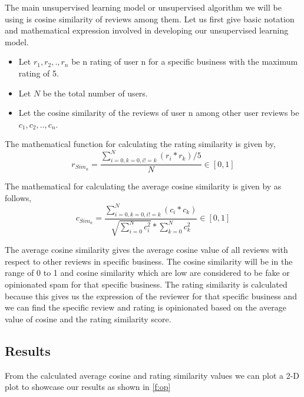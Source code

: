 \documentclass[sigconf]{acmart}
\begin{document}
The main unsupervised learning model or unsupervised algorithm we will be using is cosine similarity of reviews among them. Let us first give basic notation and mathematical expression involved in developing our unsupervised learning model.

\begin{itemize}
    \item Let \(r_1,r_2,.,r_n\) be n rating of user n for a specific business with the maximum rating of 5.
    \item Let \(N\) be the total number of users.
    \item Let the cosine similarity of the reviews of user n among other user reviews be \(c_1,c_2,..,c_n\).
\end{itemize}

The mathematical function for calculating the rating similarity is given by,
\begin{equation}
    r_{Sim_{n}} = \frac{\sum_{i=0,k=0,i!=k}^{N}(r_i*r_k)/5}{N} \in [0,1]
\end{equation}

The mathematical for calculating the average cosine similarity is given by as follows,
\begin{equation}
    c_{Sim_n} = \frac{\sum_{i=0,k=0,i!=k}^{N}(c_i*c_k)}{\sqrt{\sum_{i=0}^{N}c_i^2}* \sum_{k=0}^{N}c_k^2} \in [0,1]
\end{equation}

The average cosine similarity gives the average cosine value of all reviews with respect to other reviews in specific business. The cosine similarity will be in the range of 0 to 1 and cosine similarity which are low are considered to be fake or opinionated spam for that specific business. The rating similarity is calculated because this gives us the expression of the reviewer for that specific business and we can find the specific review and rating is opinionated based on the average value of cosine and the rating similarity score.

\subsection{Results}

From the calculated average cosine and rating similarity values we can plot a 2-D plot to showcase our results as shown in \ref{f:op}
\end{document}
